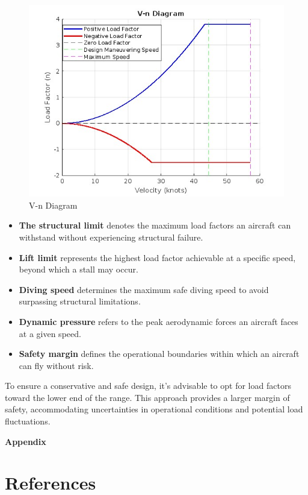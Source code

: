 \documentclass[12 pt]{article}
\begin{document}
{\begin{figure}[h]
    \centering
    \includegraphics[width=0.90\linewidth]{final vn.jpg}
    \caption{V-n Diagram}
    \label{fig:v-n-diagram}
\end{figure}
\newpage

\begin{itemize}\\
    \item \textbf{The structural limit} denotes the maximum load factors an aircraft can withstand without experiencing structural failure. 
    \item \textbf{Lift limit} represents the highest load factor achievable at a specific speed, beyond which a stall may occur. 
    \item \textbf{Diving speed} determines the maximum safe diving speed to avoid surpassing structural limitations. 
    \item \textbf{Dynamic pressure} refers to the peak aerodynamic forces an aircraft faces at a given speed. 
    \item \textbf{Safety margin} defines the operational boundaries within which an aircraft can fly without risk.
\end{itemize}

To ensure a conservative and safe design, it's advisable to opt for load factors toward the lower end of the range. This approach provides a larger margin of safety, accommodating uncertainties in operational conditions and potential load fluctuations.


\newpage
\textbf{\Huge{Appendix}}
\appendix


\section{References}
%



}
\end{document}
